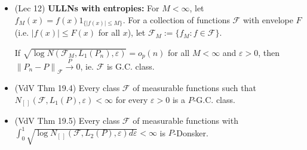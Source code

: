 \documentclass[twoside]{article}
\newcommand{\dis}{\displaystyle}
\newcommand{\norm}[1]{\left\|{#1}\right\|} %
\newcommand\calF{\mathcal{F}}
\def\eps{\varepsilon}
\newcommand\cp{\stackrel{P}{\goesto}}
\newcommand\goesto{\rightarrow}
\begin{document}
\begin{itemize}
\item (Lec 12) \textbf{ULLNs with entropies:} For $M < \infty$, let $f_M(x) = f(x) 1_{\{|f(x)| \leq M\}}$. For a collection of functions $\calF$ with envelope $F$ (i.e. $|f(x)| \leq F(x)$ for all $x$), let $\calF_M := \{ f_M: f \in \calF\}$.

If $\sqrt{\log N(\calF_M,  L_1(P_n) , \eps)} = o_p(n)$  for all $M < \infty$ and $\eps >0$, then $\norm{P_n - P}_{\calF} \cp 0$, ie. $\mathcal{F}$ is G.C. class.

\item (VdV Thm 19.4) Every class $\calF$ of measurable functions such that $N_{[\,]} (\calF, L_1(P), \eps) < \infty$ for every $\eps > 0$ is a $P$-G.C. class.

\item (VdV Thm 19.5) Every class $\calF$ of measurable functions with $\dis\int_0^1 \sqrt{\log N_{[\,]}(\calF, L_2(P), \eps) d\eps} < \infty$ is $P$-Donsker.

\end{itemize}

\end{document}
